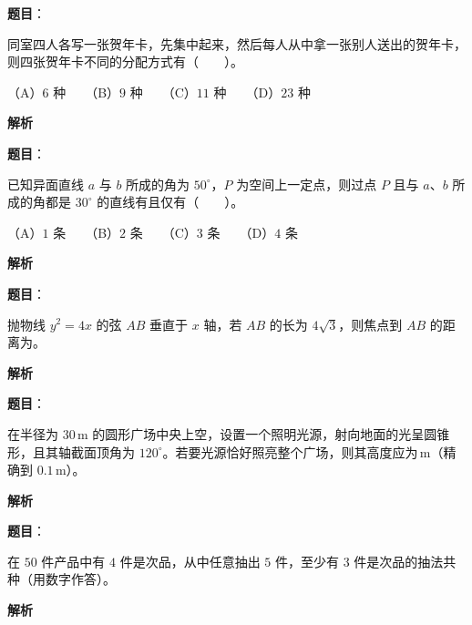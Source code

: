 \begin{answer}

\textbf{题目}：

同室四人各写一张贺年卡，先集中起来，然后每人从中拿一张别人送出的贺年卡，则四张贺年卡不同的分配方式有\mbox{（　　）}。

（A）$6$ 种　　（B）$9$ 种　　（C）$11$ 种　　（D）$23$ 种

\textbf{解析}


\end{answer}
\begin{answer}

\textbf{题目}：

已知异面直线 $a$ 与 $b$ 所成的角为 $50^\circ$，$P$ 为空间上一定点，则过点 $P$ 且与 $a\text{、}b$ 所成的角都是 $30^\circ$ 的直线有且仅有\mbox{（　　）}。

（A）$1$ 条　　（B）$2$ 条　　（C）$3$ 条　　（D）$4$ 条

\textbf{解析}


\end{answer}
\begin{answer}

\textbf{题目}：

抛物线 $y^2=4x$ 的弦 $AB$ 垂直于 $x$ 轴，若 $AB$ 的长为 $4\sqrt3$，则焦点到 $AB$ 的距离为\underline{\qquad\qquad}。

\textbf{解析}


\end{answer}
\begin{answer}

\textbf{题目}：

在半径为 $30\,\mathrm m$ 的圆形广场中央上空，设置一个照明光源，射向地面的光呈圆锥形，且其轴截面顶角为 $120^\circ$。若要光源恰好照亮整个广场，则其高度应为\underline{\qquad\qquad}$\,\mathrm m$（精确到 $0.1\,\mathrm m$）。

\textbf{解析}


\end{answer}
\begin{answer}

\textbf{题目}：

在 $50$ 件产品中有 $4$ 件是次品，从中任意抽出 $5$ 件，至少有 $3$ 件是次品的抽法共\underline{\qquad\qquad}种（用数字作答）。

\textbf{解析}


\end{answer}
